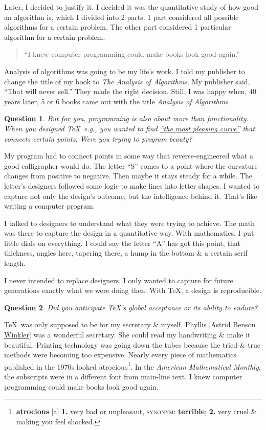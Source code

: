 \documentclass[oneside]{book}
\numberwithin{equation}{section}
\newtheorem{question}{Question}[chapter]
\begin{document}
Later, I decided to justify it. I decided it was the quantitative study of how good an algorithm is, which I divided into 2 parts. 1 part considered all possible algorithms for a certain problem. The other part considered 1 particular algorithm for a certain problem.
\begin{quotation}
	``I knew computer programming could make books look good again.''
\end{quotation}
Analysis of algorithms was going to be my life's work. I told my publisher to change the title of my book to \textit{The Analysis of Algorithms}. My publisher said, ``That will never sell.'' They made the right decision. Still, I was happy when, 40 years later, 5 or 6 books came out with the title \textit{Analysis of Algorithms}.

\begin{question}
	But for you, programming is also about more than functionality. When you designed \TeX\, e.g., you wanted to find \href{https://projecteuclid.org/download/pdf_1/euclid.bams/1183544082}{``the most pleasing curve''} that connects certain points. Were you trying to program beauty?
\end{question}
My program had to connect points in some way that reverse-engineered what a good calligrapher would do. The letter ``S'' comes to a point where the curvature changes from positive to negative. Then maybe it stays steady for a while. The letter's designers followed some logic to make lines into letter shapes. I wanted to capture not only the design's outcome, but the intelligence behind it. That's like writing a computer program.

I talked to designers to understand what they were trying to achieve. The math was there to capture the design in a quantitative way. With mathematics, I put little dials on everything. I could say the letter ``A'' has got this point, that thickness, angles here, tapering there, a hump in the bottom \& a certain serif length.

I never intended to replace designers. I only wanted to capture for future generations exactly what we were doing then. With \TeX, a design is reproducible.

\begin{question}
	Did you anticipate \TeX's global acceptance or its ability to endure?
\end{question}
\TeX\ was only supposed to be for my secretary \& myself. \href{https://www-cs-faculty.stanford.edu/~knuth/news98.html}{Phyllis [Astrid Benson Winkler]} was a wonderful secretary. She could read my handwriting \& make it beautiful. Printing technology was going down the tubes because the tried-\&-true methods were becoming too expensive. Nearly every piece of mathematics published in the 1970s looked atrocious\footnote{\textbf{atrocious} [a] \textbf{1.} very bad or unpleasant, \textsc{synonym}: \textbf{terrible}; \textbf{2.} very cruel \& making you feel shocked.}. In the \textit{American Mathematical Monthly}, the subscripts were in a different font from main-line text. I knew computer programming could make books look good again.
\end{document}
